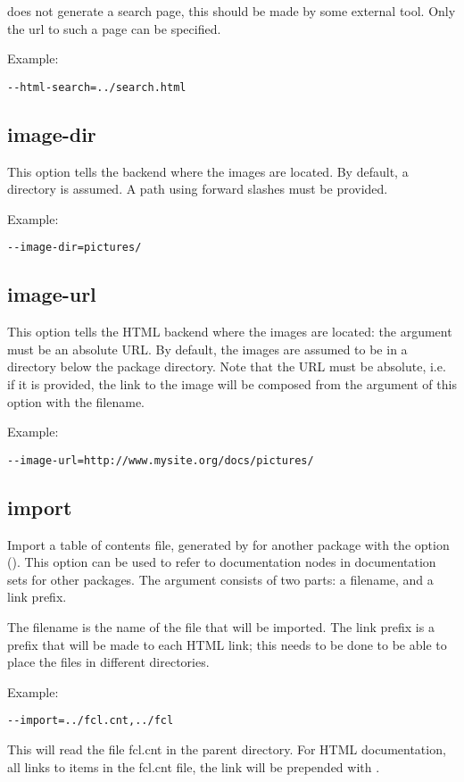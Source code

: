\fpdoc does not generate a search page, this should be made by some external
tool. Only the url to such a page can be specified.

Example:
\begin{verbatim}
--html-search=../search.html
\end{verbatim}

\subsection{image-dir}
\label{suse:imagedir}
This option tells the \latex backend where the images are located. By
default, a directory  is assumed. A path using forward
slashes must be provided.

Example:
\begin{verbatim}
--image-dir=pictures/
\end{verbatim}

\subsection{image-url}
\label{suse:imageurl}
This option tells the HTML backend where the images are located: the
argument must be an absolute URL. By default, the images are assumed to be
in a  directory below the package directory. Note that the URL 
must be absolute, i.e. if it is provided, the link to the image will be 
composed from the argument of this option with the filename.

Example:
\begin{verbatim}
--image-url=http://www.mysite.org/docs/pictures/
\end{verbatim}


\subsection{import}
\label{suse:import}
Import a table of contents file, generated by \fpdoc for another package
with the  option (). This option can be used 
to refer to documentation nodes in documentation sets for other packages. 
The argument consists of two parts: a filename, and a link prefix. 

The filename is the name of the file that will be imported. The link
prefix is a prefix that will be made to each HTML link; this needs to be
done to be able to place the files in different directories.

Example:
\begin{verbatim}
--import=../fcl.cnt,../fcl
\end{verbatim}
This will read the file fcl.cnt in the parent directory. For HTML
documentation, all links to items in the fcl.cnt file, the link will be
prepended with .

